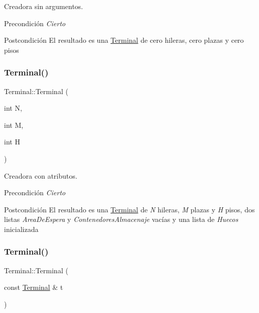 Creadora sin argumentos. 

\begin{DoxyPrecond}{Precondición}
{\itshape Cierto} 
\end{DoxyPrecond}
\begin{DoxyPostcond}{Postcondición}
El resultado es una \hyperlink{class_terminal}{Terminal} de cero hileras, cero plazas y cero pisos 
\end{DoxyPostcond}
\mbox{\label{class_terminal_a696ee89f0fc7359b528c9f8f2aec064f}} 
\subsubsection{\texorpdfstring{Terminal()}{Terminal()}\hspace{0.1cm}{\footnotesize\ttfamily [2/3]}}
{\footnotesize\ttfamily Terminal\+::\+Terminal (\begin{DoxyParamCaption}\item[{int}]{N,  }\item[{int}]{M,  }\item[{int}]{H }\end{DoxyParamCaption})}



Creadora con atributos. 

\begin{DoxyPrecond}{Precondición}
{\itshape Cierto} 
\end{DoxyPrecond}
\begin{DoxyPostcond}{Postcondición}
El resultado es una \hyperlink{class_terminal}{Terminal} de {\itshape N} hileras, {\itshape M} plazas y {\itshape H} pisos, dos listas {\itshape Area\+De\+Espera} y {\itshape Contenedores\+Almacenaje} vacías y una lista de {\itshape Huecos} inicializada 
\end{DoxyPostcond}
\mbox{\label{class_terminal_a2502d3b03ed7f7f479b73e6575dedbf0}} 
\subsubsection{\texorpdfstring{Terminal()}{Terminal()}\hspace{0.1cm}{\footnotesize\ttfamily [3/3]}}
{\footnotesize\ttfamily Terminal\+::\+Terminal (\begin{DoxyParamCaption}\item[{const \hyperlink{class_terminal}{Terminal} \&}]{t }\end{DoxyParamCaption})}



